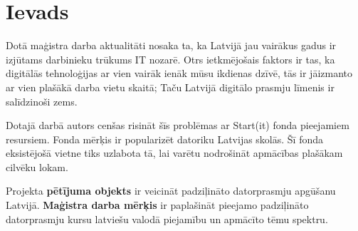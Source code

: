 \chapter*{Ievads} %
Dotā maģistra darba aktualitāti nosaka ta, ka Latvijā jau vairākus gadus ir izjūtams darbinieku 
trūkums IT nozarē. Otrs ietkmējošais faktors ir tas, ka digitālās tehnoloģijas ar vien vairāk
ienāk mūsu ikdienas dzīvē, tās ir jāizmanto ar vien plašākā darba vietu skaitā; Taču Latvijā
digitālo prasmju līmenis ir salīdzinoši zems. 
\par
Dotajā darbā autors cenšas risināt šīs problēmas ar Start(it) fonda pieejamiem resursiem. Fonda mērķis
ir popularizēt datoriku Latvijas skolās. Šī fonda eksistējošā vietne tiks uzlabota tā, lai varētu 
nodrošināt apmācības plašākam cilvēku lokam.
\par
Projekta \textbf{pētījuma objekts} ir veicināt padziļināto datorprasmju apgūšanu Latvijā.
\textbf{Maģistra darba mērķis} ir paplašināt pieejamo padziļināto datorprasmju kursu latviešu valodā
piejamību un apmācīto tēmu spektru.


